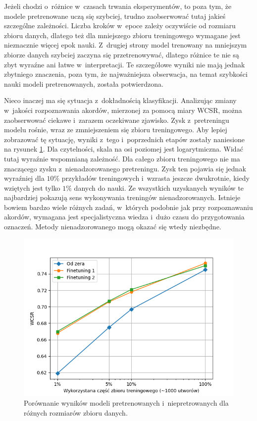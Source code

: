 Jeżeli chodzi o~różnice w~czasach trwania eksperymentów, to poza tym, że modele pretrenowane uczą się szybciej, trudno zaobserwować tutaj jakieś szczególne zależności. Liczba kroków w~epoce zależy oczywiście od rozmiaru zbioru danych, dlatego też dla mniejszego zbioru treningowego wymagane jest nieznacznie więcej epok nauki. Z~drugiej strony model trenowany na mniejszym zbiorze danych szybciej zaczyna się przetrenowywać, dlatego różnice te nie są zbyt wyraźne ani łatwe w~interpretacji. Te szczegółowe wyniki nie mają jednak zbytniego znaczenia, poza tym, że najważniejsza obserwacja, na temat szybkości nauki modeli pretrenowanych, została potwierdzona.

Nieco inaczej ma się sytuacja z~dokładnością klasyfikacji. Analizując zmiany w~jakości rozpoznawania akordów, mierzonej za pomocą miary WCSR, można zaobserwować ciekawe i~zarazem oczekiwane zjawisko. Zysk z~pretreningu modelu rośnie, wraz ze zmniejszeniem się zbioru treningowego. Aby lepiej zobrazować tę sytuację, wyniki z~tego i~poprzednich etapów zostały naniesione na rysunek \ref{fig:final_results}. Dla czytelności, skala na osi poziomej jest logarytmiczna. Widać tutaj wyraźnie wspomnianą zależność. Dla całego zbioru treningowego nie ma znaczącego zysku z~nienadzorowanego pretreningu. Zysk ten pojawia się jednak wyraźniej dla $10\%$ przykładów treningowych i~wzrasta jeszcze dwukrotnie, kiedy wziętych jest tylko $1\%$ danych do nauki. Ze wszystkich uzyskanych wyników te najbardziej pokazują sens wykonywania treningów nienadzorowanych. Istnieje bowiem bardzo wiele różnych zadań, w~których podobnie jak przy rozpoznawaniu akordów, wymagana jest specjalistyczna wiedza i~dużo czasu do przygotowania oznaczeń. Metody nienadzorowanego mogą okazać się wtedy niezbędne.

\begin{figure}
    \centering
    \includegraphics[width=1.0\textwidth]{images/final_results.png}
    \caption{Porównanie wyników modeli pretrenowanych i~niepretrowanych dla różnych rozmiarów zbioru danych.}
    \label{fig:final_results}
\end{figure}
